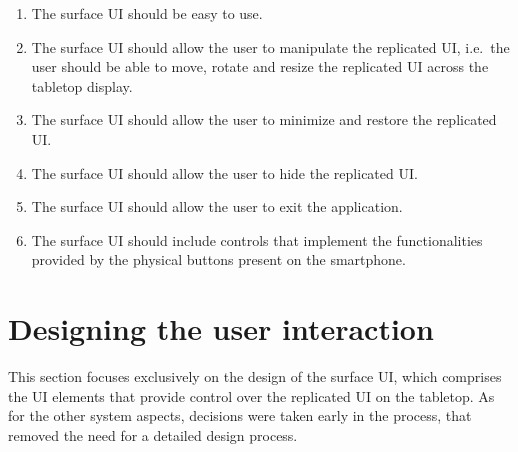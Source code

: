 \label{RD}
\begin{enumerate}[{RD}-1]
\item The surface UI should be easy to use.
\item The surface UI should allow the user to manipulate the replicated UI, i.e.\ the user should be able to move, rotate and resize the replicated UI across the tabletop display.
\item The surface UI should allow the user to minimize and restore the replicated UI.
\item The surface UI should allow the user to hide the replicated UI.
\item The surface UI should allow the user to exit the application.
\item The surface UI should include controls that implement the functionalities provided by the physical buttons present on the smartphone.
\end{enumerate}


%
%
%

\section{Designing the user interaction}
\label{sec:interaction}

This section focuses exclusively on the design of the surface UI, which comprises the UI elements that provide control over the replicated UI on the tabletop.
As for the other system aspects, decisions were taken early in the process, that removed the need for a detailed design process.


